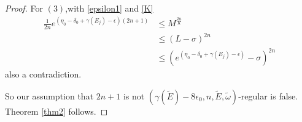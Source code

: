 \begin{proof}
For $(3)$,with \eqref{epsilon1} and \eqref{K}
\[
\begin{aligned}
  \frac{1}{2n}e^{(\eta_0-\delta_0+\gamma(E_j)-\epsilon)(2n+1)}
  &\leq M^{\frac{2n}{K}}\\
  &\leq (L-\sigma)^{2n}\\
  &\leq(e^{(\eta_0-\delta_0+\gamma(E_j)-\epsilon)}-\sigma)^{2n}
\end{aligned}
\]
also a contradiction.

So our assumption that $2n+1$ is not  $(\gamma(\tilde{E})-8\epsilon_0,n,\tilde{E},\tilde{\omega})$-regular is false. Theorem \ref{thm2} follows.
\end{proof}
